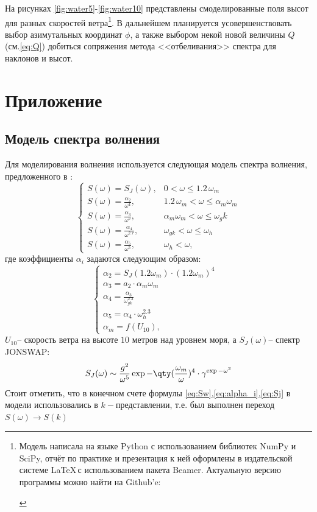 На рисунках \ref{fig:water5}-\ref{fig:water10} представлены 
смоделированные  поля высот для разных скоростей ветра\footnote{Модель написала на языке Python с использованием библиотек NumPy и SciPy, отчёт по практике и презентация к ней оформлены в издательской системе \LaTeX\,с использованием пакета Beamer. Актуальную версию программы можно найти на 
Github'e: 
\begin{center}
\end{center}}. В дальнейшем планируется усовершенствовать выбор азимутальных координат $\phi$, а также выбором некой новой величины $Q$ (см.\eqref{eq:Q}) добиться сопряжения метода <<отбеливания>> спектра для наклонов и высот. 
% 

\appendix
\section{Приложение}
\label{model}
\subsection{Модель спектра волнения}

Для моделирования волнения используется следующая модель спектра волнения, предложенного в \cite{Karaev2}: 
\begin{equation}
	\label{eq:Sw}
	\begin{cases}
		S(\omega)=S_J(\omega), &  0<\omega\leq 1.2\,\omega_m\\
		S(\omega)= \frac{\alpha_2}{\omega^4}, &  1.2 \,\omega_m < \omega \leq \alpha_m \omega_m\\
		S(\omega)= \frac{\alpha_3}{\omega^5}, &   \alpha_m \omega_m< \omega \leq \omega_gk\\
		S(\omega)= \frac{\alpha_4}{\omega^{2.7}}, & \omega_{gk}<\omega\leq \omega_h\\
		S(\omega)= \frac{\alpha_5}{\omega^5}, & \omega_h<\omega,
	\end{cases}
\end{equation}
где коэффициенты $\alpha_i$ задаются следующим образом:
\begin{equation}
	\label{eq:alpha_i}
	\begin{cases}
		\alpha_2=S_J(1.2 \omega_m)\cdot (1.2 \omega_m)^4 \\
		\alpha_3=a_2\cdot \alpha_m \omega_m \\
		\alpha_4= \frac{\alpha_3}{\omega^{2.3}_{gk}} \\
		\alpha_5 = \alpha_4 \cdot \omega_h^{2.3} \\
		\alpha_m = f(U_{10}), & 
	\end{cases}
\end{equation}
$U_{10} \text{-- скорость ветра на высоте 10 метров над уровнем моря,}$ а $S_J(\omega)$-- спектр JONSWAP:
\begin{equation}
\label{eq:Sj}
	S_J(\omega)\sim \frac{g^2}{\omega^{5}}\exp{-\qty(\frac{\omega_m}{\omega})^4}
	\cdot \gamma^{\exp{-\omega^2}}
\end{equation}
Стоит отметить, что в конечном счете формулы \eqref{eq:Sw},\eqref{eq:alpha_i},\eqref{eq:Sj} в модели использовались в $k-$представлении, т.е.  был выполнен переход $S(\omega)\rightarrow S(k)$


